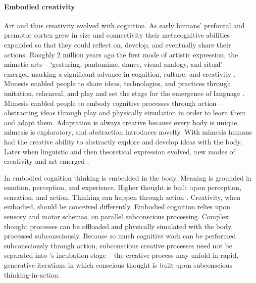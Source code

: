 \documentclass{article}
\begin{document}
\paragraph{Embodied creativity}
Art and thus creativity evolved with cognition.
As early humans' prefontal and premotor cortex grew in size and connectivity 
their metacognitive abilities expanded 
so that they could reflect on, develop, and eventually share their actions.
%
Roughly 2 million years ago the first mode of artistic expression, the mimetic arts
 -- `gesturing, pantomime, dance, visual analogy, and ritual' -- emerged
marking a significant advance in cognition, culture, and creativity \citep{Donald2006}. 
Mimesis enabled people to share ideas, technologies, and practices through imitation, rehearsal, and play and set the stage for the emergence of language \citep{Donald2006}. 
%
Mimesis enabled people to embody cognitive processes through action -- 
abstracting ideas through play \citep{Deacon2006} and physically simulation \citep{Kirsh2013}
in order to learn them and adapt them. 
Adaptation is always creative because 
every body is unique,
mimesis is exploratory,
and abstraction introduces novelty. 
%
With mimesis humans had the creative ability to abstractly explore and develop ideas with the body. 
Later when linguistic and then theoretical expression evolved, new modes of creativity and art emerged \citep{Donald2006}. 

In embodied cognition thinking is embedded in the body. Meaning is grounded in emotion, perception, and experience.
Higher thought is built upon perception, sensation, and action. Thinking can happen through action \citep{Hardy-Vallee2008}. 
Creativity, when embodied, should be conceived differently. 
Embodied cognition relies upon sensory and motor schemas, on parallel subconscious processing. 
Complex thought processes can be offloaded and physically simulated with the body, processed subconsciously. 
Because so much cognitive work can be performed subconsciously through action, 
subconscious creative processes need not be separated into \citeauthor{Wallas1926}'s incubation stage -- 
the creative process may unfold in rapid, generative iterations in which conscious thought is built upon subconscious thinking-in-action.
\end{document}
